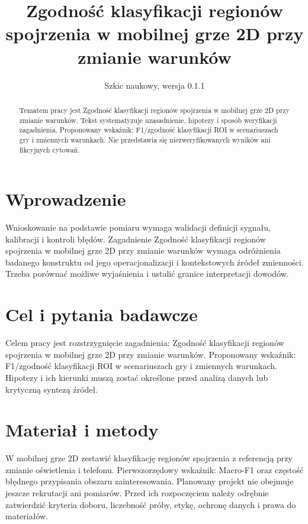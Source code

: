 \documentclass[11pt,a4paper]{article}
\title{Zgodność klasyfikacji regionów spojrzenia w mobilnej grze 2D przy zmianie warunków}
\author{}
\date{Szkic naukowy, wersja 0.1.1}
\begin{document}
\maketitle

\begin{abstract}

Tematem pracy jest Zgodność klasyfikacji regionów spojrzenia w mobilnej grze 2D przy zmianie warunków. Tekst systematyzuje uzasadnienie, hipotezy i sposób weryfikacji zagadnienia. Proponowany wskaźnik: F1/zgodność klasyfikacji ROI w scenariuszach gry i zmiennych warunkach. Nie przedstawia się niezweryfikowanych wyników ani fikcyjnych cytowań.

\end{abstract}

\section{Wprowadzenie}

Wnioskowanie na podstawie pomiaru wymaga walidacji definicji sygnału, kalibracji i kontroli błędów. Zagadnienie Zgodność klasyfikacji regionów spojrzenia w mobilnej grze 2D przy zmianie warunków wymaga odróżnienia badanego konstruktu od jego operacjonalizacji i kontekstowych źródeł zmienności. Trzeba porównać możliwe wyjaśnienia i ustalić granice interpretacji dowodów.

\section{Cel i pytania badawcze}

Celem pracy jest rozstrzygnięcie zagadnienia: Zgodność klasyfikacji regionów spojrzenia w mobilnej grze 2D przy zmianie warunków. Proponowany wskaźnik: F1/zgodność klasyfikacji ROI w scenariuszach gry i zmiennych warunkach. Hipotezy i ich kierunki muszą zostać określone przed analizą danych lub krytyczną syntezą źródeł.

\section{Materiał i metody}

W mobilnej grze 2D zestawić klasyfikację regionów spojrzenia z referencją przy zmianie oświetlenia i telefonu. Pierwszorzędowy wskaźnik: Macro-F1 oraz częstość błędnego przypisania obszaru zainteresowania. Planowany projekt nie obejmuje jeszcze rekrutacji ani pomiarów. Przed ich rozpoczęciem należy odrębnie zatwierdzić kryteria doboru, liczebność próby, etykę, ochronę danych i prawa do materiałów.
\end{document}
